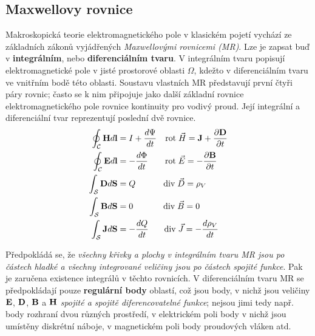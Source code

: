     \subsection{Maxwellovy rovnice}
      Makroskopická teorie elektromagnetického pole v klasickém pojetí vychází ze základních zákonů
      vyjádřených \emph{Maxwellovými rovnicemi (MR)}. Lze je zapsat buď v \textbf{integrálním},
      nebo \textbf{diferenciálním tvaru}. V integrálním tvaru popisují elektromagnetické pole v
      jisté prostorové oblasti $\Omega$, kdežto v diferenciálním tvaru ve vnitřním bodě této
      oblasti. Soustavu vlastních MR představují první čtyři páry rovnic; často se k nim připojuje
      jako další základní rovnice elektromagnetického pole rovnice kontinuity pro vodivý proud.
      Její integrální a diferenciální tvar reprezentují poslední dvě rovnice.
      \begin{align}
        \oint_{\mathcal{C}}\mathbf{H} d\mathbf{l} &= I+\dfrac{d \Psi}{d t}
                                           \quad \mathrm{rot}\;\vec{H}=\mathbf{J}+\dfrac{\partial \mathbf{D}}{\partial t}               \\
        \oint_{\mathcal{C}}\mathbf{E} d\mathbf{l} &= -\dfrac{d \Phi}{d t}
                               \qquad \mathrm{rot}\;\vec{E}=-\dfrac{\partial \mathbf{B}}{\partial t}\\
         \int_{\mathcal{S}}\mathbf{D} d\mathbf{S} &= Q \qquad\quad\;   \mathrm{div}\;\vec{D}=\rho_V                \\
         \int_{\mathcal{S}}\mathbf{B} d\mathbf{S} &= 0 \qquad\quad\;\; \mathrm{div}\;\vec{B}=0                     \\
         \int_{\mathcal{S}}\mathbf{J} d\mathbf{S} &= -\dfrac{d Q}{d t} \quad\;\;\;\mathrm{div}\;\vec{J}=-\dfrac{d \rho_V}{d t}
      \end{align}

      Předpokládá se, že \emph{všechny křivky a plochy v integrálním tvaru MR jsou po částech
      hladké a všechny integrované veličiny jsou po částech spojité funkce}. Pak je zaručena
      existence integrálů v těchto rovnicích. V diferenciálním tvaru MR se předpokládají pouze
      \textbf{regulární body} oblastí, což jsou body, v nichž jsou veličiny $\mathbf{E}$, $\mathbf{D}$,
      $\mathbf{B}$ a $\mathbf{H}$ \emph{spojité a spojitě diferencovatelné funkce}; nejsou jimi tedy např.
      body rozhraní dvou různých prostředí, v elektrickém poli body v nichž jsou umístěny diskrétní
      náboje, v magnetickém poli body proudových vláken atd.

        
      
